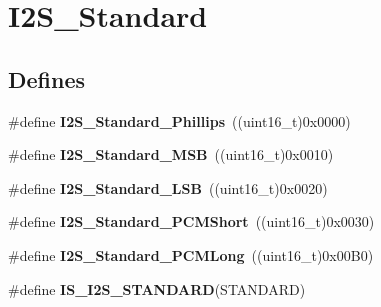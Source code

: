 \hypertarget{group__I2S__Standard}{
\section{I2S\_\-Standard}
\label{group__I2S__Standard}
}
\subsection*{Defines}
\begin{DoxyCompactItemize}
\item 
\hypertarget{group__I2S__Standard_gacdb89d66a2a941924ff4b7a8d14884f9}{
\#define {\bfseries I2S\_\-Standard\_\-Phillips}~((uint16\_\-t)0x0000)}
\label{group__I2S__Standard_gacdb89d66a2a941924ff4b7a8d14884f9}

\item 
\hypertarget{group__I2S__Standard_gae716cfa7e031affc37fe65dd80b0e6f4}{
\#define {\bfseries I2S\_\-Standard\_\-MSB}~((uint16\_\-t)0x0010)}
\label{group__I2S__Standard_gae716cfa7e031affc37fe65dd80b0e6f4}

\item 
\hypertarget{group__I2S__Standard_ga88bc9001a13b95a0844d81fea2080df6}{
\#define {\bfseries I2S\_\-Standard\_\-LSB}~((uint16\_\-t)0x0020)}
\label{group__I2S__Standard_ga88bc9001a13b95a0844d81fea2080df6}

\item 
\hypertarget{group__I2S__Standard_gaaf59e587048ff632037dfc9875ab4c7b}{
\#define {\bfseries I2S\_\-Standard\_\-PCMShort}~((uint16\_\-t)0x0030)}
\label{group__I2S__Standard_gaaf59e587048ff632037dfc9875ab4c7b}

\item 
\hypertarget{group__I2S__Standard_gaf79cb88702059506d876dbd776d7a136}{
\#define {\bfseries I2S\_\-Standard\_\-PCMLong}~((uint16\_\-t)0x00B0)}
\label{group__I2S__Standard_gaf79cb88702059506d876dbd776d7a136}

\item 
\#define {\bfseries IS\_\-I2S\_\-STANDARD}(STANDARD)
\end{DoxyCompactItemize}


